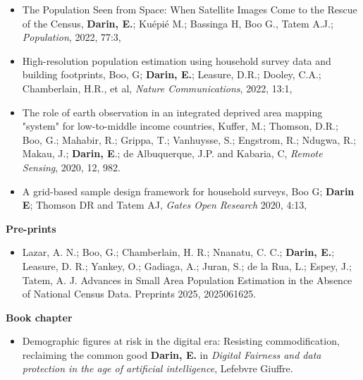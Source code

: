 \documentclass[
]{friggeri-cv}
\begin{document}
\begin{noside}
\begin{itemize}
\item The Population Seen from Space: When Satellite Images Come to the Rescue of the Census, \textbf{Darin, E.}; Kuépié M.; Bassinga H, Boo G., Tatem A.J.; \textit{Population}, 2022, 77:3, \href{https://doi.org/10.3917/popu.2203.0467}{\scriptsize{}}
\item High-resolution population estimation using household survey data and building footprints, Boo, G; \textbf{Darin, E.}; Leasure, D.R.; Dooley, C.A.; Chamberlain, H.R., et al, \textit{Nature Communications}, 2022, 13:1,    \href{https://www.nature.com/articles/s41467-022-29094-x}{\scriptsize{}}
\item The role of earth observation in an integrated deprived area mapping "system" for low-to-middle income countries, Kuffer, M.; Thomson, D.R.; Boo, G.; Mahabir, R.; Grippa, T.; Vanhuysse, S.; Engstrom, R.; Ndugwa, R.; Makau, J.; \textbf{Darin, E}.; de Albuquerque, J.P. and Kabaria, C, \textit{Remote Sensing}, 2020, 12, 982.    \href{https://www.mdpi.com/2072-4292/12/6/982}{\scriptsize{}} 
\item A grid-based sample design framework for household surveys, Boo G; \textbf{Darin E}; Thomson DR and Tatem AJ, \textit{Gates Open Research} 2020, 4:13, \href{https://gatesopenresearch.org/articles/4-13/v1}{\scriptsize{}}
\end{itemize}

\textbf{Pre-prints}
\begin{itemize}
\item Lazar,  A. N.; Boo,  G.; Chamberlain,  H. R.; Nnanatu,  C. C.; \textbf{Darin,  E.}; Leasure,  D. R.; Yankey,  O.; Gadiaga,  A.; Juran,  S.; de la Rua,  L.; Espey,  J.; Tatem,  A. J. Advances in Small Area Population Estimation in the Absence of National Census Data. Preprints 2025, 2025061625. \href{https://doi.org/10.20944/preprints202506.1625.v2}{\scriptsize{}}
\end{itemize}


\textbf{Book chapter}
\begin{itemize}
\item Demographic figures at risk in the digital era: Resisting commodification, reclaiming the common good \textbf{Darin, E.} in \textit{Digital Fairness and data protection in the age of artificial intelligence}, Lefebvre Giuffre. \href{https://shopdata.giuffre.it/media/estratti/ESTRATTO_024228064.pdf}{\scriptsize{}}
\end{itemize}


\end{noside}
\end{document}
